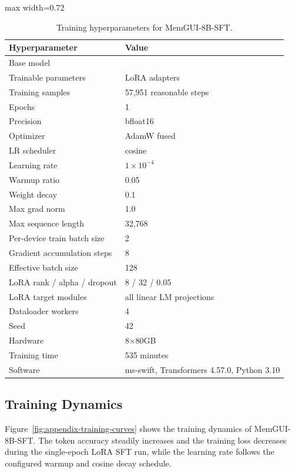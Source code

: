 \documentclass{llmxive}
\providecommand{\llmname}[1]{{\fontfamily{pcr}\selectfont{#1}}}
\begin{document}
\begin{table}[!htbp]
\centering
\footnotesize
\begin{adjustbox}{max width=0.72\linewidth}
\begin{tabular}{ll}
\toprule
Hyperparameter & Value \\
\midrule
Base model & \llmname{Qwen3-VL-8B-Instruct} \\
Trainable parameters & LoRA adapters \\
Training samples & 57{,}951 reasonable steps \\
Epochs & 1 \\
Precision & bfloat16 \\
Optimizer & AdamW fused \\
LR scheduler & cosine \\
Learning rate & $1\times10^{-4}$ \\
Warmup ratio & 0.05 \\
Weight decay & 0.1 \\
Max grad norm & 1.0 \\
Max sequence length & 32{,}768 \\
Per-device train batch size & 2 \\
Gradient accumulation steps & 8 \\
Effective batch size & 128 \\
LoRA rank / alpha / dropout & 8 / 32 / 0.05 \\
LoRA target modules & all linear LM projections \\
Dataloader workers & 4 \\
Seed & 42 \\
Hardware & 8$\times$80GB \\
Training time & 535 minutes \\
Software & ms-swift, Transformers 4.57.0, Python 3.10 \\
\bottomrule
\end{tabular}
\end{adjustbox}
\caption{Training hyperparameters for MemGUI-8B-SFT.}
\label{tab:appendix-training-hparams}
\end{table}

\subsection{Training Dynamics}
\label{sec:appendix-training-dynamics}

Figure~\ref{fig:appendix-training-curves} shows the training dynamics of MemGUI-8B-SFT. The token accuracy steadily increases and the training loss decreases during the single-epoch LoRA SFT run, while the learning rate follows the configured warmup and cosine decay schedule.
\end{document}
